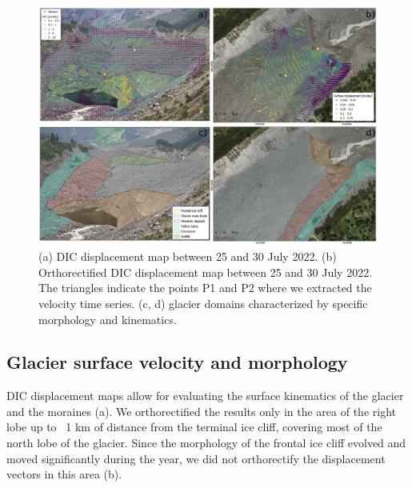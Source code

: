 \begin{figure}[ht]
  \includegraphics[width=174mm]{4_dic_composition.png}
  \caption{(a) DIC displacement map between 25 and 30 July 2022. (b) Orthorectified DIC
    displacement map between 25 and 30 July 2022. The triangles indicate the points P1
    and P2 where we extracted the velocity time series.
    (c, d) glacier domains characterized by specific morphology and kinematics. }
  \label{fig:4:dic_results}
\end{figure}

\subsection{Glacier surface velocity and morphology}\label{sec:4:res_velocity}

DIC displacement maps allow for evaluating the surface kinematics of the glacier and the
moraines (a).
We orthorectified the results only in the area of the right lobe up
to ~1 km of distance from the terminal ice cliff, covering most of the north lobe of the
glacier.
Since the morphology of the frontal ice cliff evolved and moved significantly
during the year, we did not orthorectify the displacement vectors in this area
(b).

